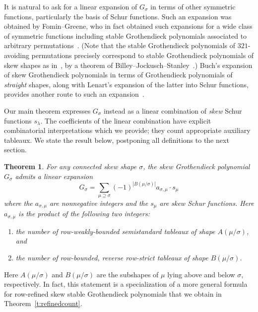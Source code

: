 \documentclass[11pt]{article}
\newtheorem{theo}[theorem]{Theorem}
\theoremstyle{definition}
\begin{document}
It is natural to ask for a linear expansion of $G_\sigma$ in terms of other symmetric functions, particularly the basis of Schur functions. 
Such an expansion was obtained by Fomin--Greene, who in fact obtained such expansions for a wide class of symmetric functions including stable Grothendieck polynomials associated to arbitrary permutations~\cite{fomin-greene-noncommutative}. (Note that the stable Grothendieck polynomials of $321$-avoiding permutations precisely correspond to stable Grothendieck polynomials of skew shapes as in~\cite{buch-littlewood-richardson}, by a theorem of Billey--Jockusch--Stanley~\cite{billey-jockusch-stanley-some}.) Buch's expansion of skew Grothendieck polynomials in terms of Grothendieck polynomials of \emph{straight} shapes, along with Lenart's expansion of the latter into Schur functions, provides another route to such an expansion~\cite{buch-littlewood-richardson,lenart-combinatorial}. 

Our main theorem expresses $G_\sigma$ instead as a linear combination of \emph{skew} Schur functions $s_\lambda$. 
The coefficients of the linear combination have explicit combinatorial interpretations which we provide; they count appropriate auxiliary tableaux. We state the result below, postponing all definitions to the next section.

\begin{theo}\label{thm:comb}
For any connected skew shape $\sigma$, the skew Grothendieck polynomial $G_\sigma$ admits a linear expansion 
\[
G_\sigma = \sum_{\mu\supseteq \sigma} (-1)^{|B(\mu/\sigma)|} a_{\sigma,\mu} \cdot s_\mu
\]
where the $a_{\sigma, \mu}$ are nonnegative integers and the $s_\mu$ are skew Schur functions. Here $a_{\sigma,\mu}$ is the product of the following two integers:


\begin{enumerate}
\item\label{theo1.1_1} the number of row-weakly-bounded semistandard tableaux of shape $A(\mu/\sigma)$, and
\item\label{theo1.1_2} the number of row-bounded, reverse row-strict tableaux of shape $B(\mu/\sigma)$.
\end{enumerate}
\end{theo}

\noindent Here $A(\mu/\sigma)$ and $B(\mu/\sigma)$ are the subshapes of $\mu$ lying above and below $\sigma$, respectively. In fact, this statement is a specialization of a more general formula for row-refined skew stable Grothendieck polynomials that we obtain in Theorem~\ref{t:refinedcount}. 
\end{document}

